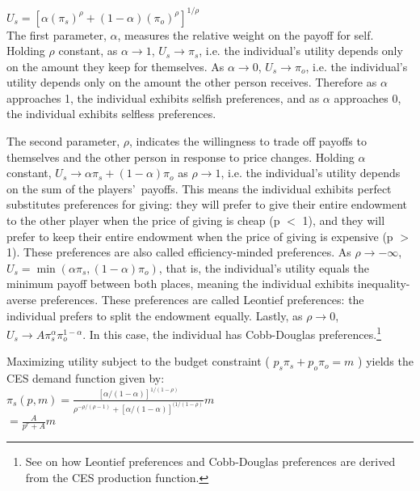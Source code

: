 \documentclass[12pt]{article}
\begin{document}
\(U_{s} = [\alpha(\pi_{s})^{\rho} + (1-\alpha)(\pi_{o})^{\rho}]^{1/\rho}\) \\


The first parameter, \(\alpha\), measures the relative weight on the payoff for self. Holding \(\rho\) constant, as \(\alpha \rightarrow 1\), \(U_{s} \rightarrow \pi_{s}\), i.e. the individual\rq s utility depends only on the amount they keep for themselves. As \(\alpha \rightarrow 0\), \(U_{s} \rightarrow \pi_{o}\), i.e. the individual\rq s utility depends only on the amount the other person receives. Therefore as \(\alpha\) approaches 1, the individual exhibits selfish preferences, and as \(\alpha\) approaches 0, the individual exhibits selfless preferences.

The second parameter, \(\rho\), indicates the willingness to trade off payoffs to themselves and the other person in response to price changes. Holding \(\alpha\) constant, \(U_{s} \rightarrow \alpha\pi_{s} + (1-\alpha)\pi_{o}\) as \(\rho \rightarrow 1\),  i.e. the individual\rq s utility depends on the sum of the players\rq \ payoffs. This means the individual exhibits perfect substitutes preferences for giving: they will prefer to give their entire endowment to the other player when the price of giving is cheap (p $<$ 1), and they will prefer to keep their entire endowment when the price of giving is expensive (p $>$ 1). These preferences are also called efficiency-minded preferences. As \(\rho \rightarrow -\infty\), \(U_{s} = \min(\alpha\pi_{s}, (1-\alpha)\pi_{o})\), that is, the individual\rq s utility equals the minimum payoff between both places, meaning the individual exhibits inequality-averse preferences. These preferences are called Leontief preferences: the individual prefers to split the endowment equally. Lastly, as \(\rho \rightarrow 0\), \(U_{s} \rightarrow A\pi_{s}^{\alpha}\pi_{o}^{1-\alpha}\). In this case, the individual has Cobb-Douglas preferences.\footnote{See \cite{arrow_1961} on how Leontief preferences and Cobb-Douglas preferences are derived from the CES production function.}

Maximizing utility subject to the budget constraint ( \(p_{s}\pi_{s} + p_{o}\pi_{o}=m\) ) yields the CES demand function given by: \\
 

\(\pi_{s}(p,m)=\frac{[\alpha/(1-\alpha)]^{1/(1-\rho)}}{\rho^{-\rho/(\rho-1)}+[\alpha/(1-\alpha)]^{(1/(1-\rho)}}m\) \\

\hspace{14.5mm} \(= \frac{A}{p^{r}+A}m\) \\
 
\end{document}
